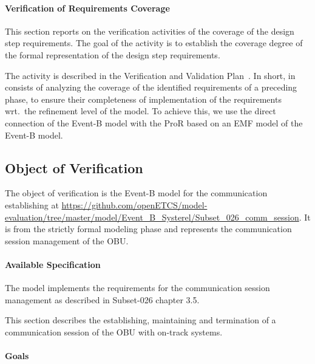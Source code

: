 \paragraph{Verification of Requirements Coverage}
\label{sec:verif-requ-cover}

This section reports on the verification activities of the coverage of the
design step requirements. The goal of the activity is to establish the coverage
degree of the formal representation of the design step requirements.

The activity is described in the Verification and Validation
Plan~\cite{vnvplan}.  In short, in consists of analyzing the coverage of the
identified requirements of a preceding phase, to ensure their completeness of
implementation of the requirements wrt.\ the refinement level of the model. To
achieve this, we use the direct connection of the Event-B model with the ProR
based on an EMF model of the Event-B model.


\subsection{Object of Verification}
\label{sec:object-verification}

The object of verification is the Event-B model for the communication
establishing at {\url{https://github.com/openETCS/model-evaluation/tree/master/model/Event_B_Systerel/Subset_026_comm_session}}. It
is from the strictly formal modeling phase and represents the communication
session management of the OBU\@.

\paragraph{Available Specification}
\label{sec:avail-spec}

The model implements the requirements for the communication session management
as described in Subset-026 chapter 3.5.

This section describes the establishing, maintaining and termination of a
communication session of the OBU with on-track systems.


\paragraph{Goals}

